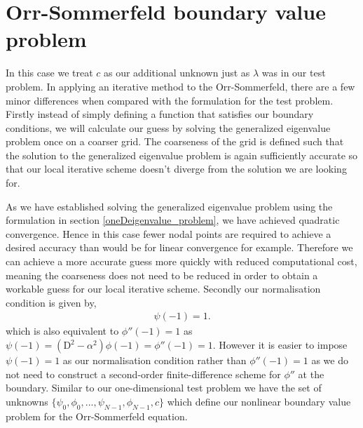 \documentclass[a4paper, 12pt, twoside, openright]{article}
\numberwithin{equation}{section}
\begin{document}
%
%
%
%
%
%
%
%
%
%
%
%
%
%

%
% 
%
%
\newpage
\section{Orr-Sommerfeld boundary value problem}\label{OSBVP}

% 
%
%
In this case we treat $c$ as our additional unknown just as $\lambda$ was in our test problem. In applying an iterative method to the Orr-Sommerfeld, there are a few minor differences when compared with the formulation for the test problem. Firstly instead of simply defining a function that satisfies our boundary conditions, we will calculate our guess by solving the generalized eigenvalue problem once on a coarser grid. The coarseness of the grid is defined such that the solution to the generalized eigenvalue problem is again sufficiently accurate so that our local iterative scheme doesn't diverge from the solution we are looking for.%

As we have established solving the generalized eigenvalue problem using the formulation in section \ref{oneDeigenvalue_problem}, we have achieved quadratic convergence. Hence in this case fewer nodal points are required to achieve a desired accuracy than would be for linear convergence for example. Therefore we can achieve a more accurate guess more quickly with reduced computational cost, meaning the coarseness does not need to be reduced in order to obtain a workable guess for our local iterative scheme. Secondly our normalisation condition is given by,     
\begin{align}
\psi(-1) = 1.
\end{align}
which is also equivalent to $\phi''(-1)=1$ as $\psi(-1) = (\mathrm{D}^2 - \alpha^2)\phi(-1) = \phi''(-1) = 1$. However it is easier to impose $\psi(-1) = 1$ as our normalisation condition rather than $\phi''(-1)=1$ as we do not need to construct a second-order finite-difference scheme for $\phi''$ at the boundary. Similar to our one-dimensional test problem we have the set of unknowns $ \{ \psi_0, \phi_0, ... , \psi_{N-1}, \phi_{N-1}, c \} $ which define our nonlinear boundary value problem for the Orr-Sommerfeld equation. %
\end{document}
